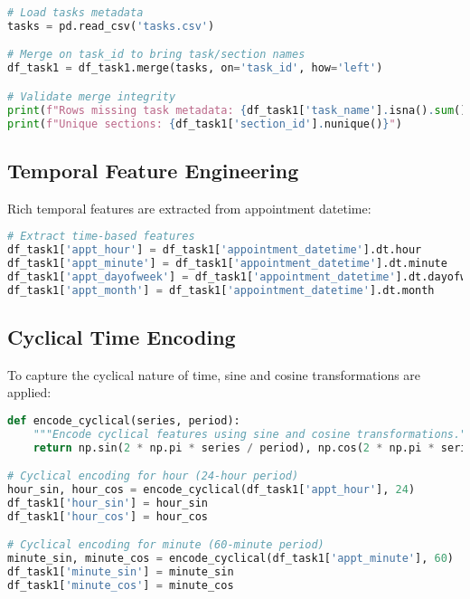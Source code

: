 \documentclass[12pt,a4paper]{article}
\begin{document}
\begin{lstlisting}[language=Python, caption=Metadata Integration]
# Load tasks metadata
tasks = pd.read_csv('tasks.csv')

# Merge on task_id to bring task/section names
df_task1 = df_task1.merge(tasks, on='task_id', how='left')

# Validate merge integrity
print(f"Rows missing task metadata: {df_task1['task_name'].isna().sum()}")
print(f"Unique sections: {df_task1['section_id'].nunique()}")
\end{lstlisting}

\subsection{Temporal Feature Engineering}

Rich temporal features are extracted from appointment datetime:

\begin{lstlisting}[language=Python, caption=Temporal Feature Extraction]
# Extract time-based features
df_task1['appt_hour'] = df_task1['appointment_datetime'].dt.hour
df_task1['appt_minute'] = df_task1['appointment_datetime'].dt.minute
df_task1['appt_dayofweek'] = df_task1['appointment_datetime'].dt.dayofweek  # 0=Monday
df_task1['appt_month'] = df_task1['appointment_datetime'].dt.month
\end{lstlisting}

\subsection{Cyclical Time Encoding}

To capture the cyclical nature of time, sine and cosine transformations are applied:

\begin{lstlisting}[language=Python, caption=Cyclical Time Encoding]
def encode_cyclical(series, period):
    """Encode cyclical features using sine and cosine transformations."""
    return np.sin(2 * np.pi * series / period), np.cos(2 * np.pi * series / period)

# Cyclical encoding for hour (24-hour period)
hour_sin, hour_cos = encode_cyclical(df_task1['appt_hour'], 24)
df_task1['hour_sin'] = hour_sin
df_task1['hour_cos'] = hour_cos

# Cyclical encoding for minute (60-minute period)
minute_sin, minute_cos = encode_cyclical(df_task1['appt_minute'], 60)
df_task1['minute_sin'] = minute_sin
df_task1['minute_cos'] = minute_cos
\end{lstlisting}
\end{document}
